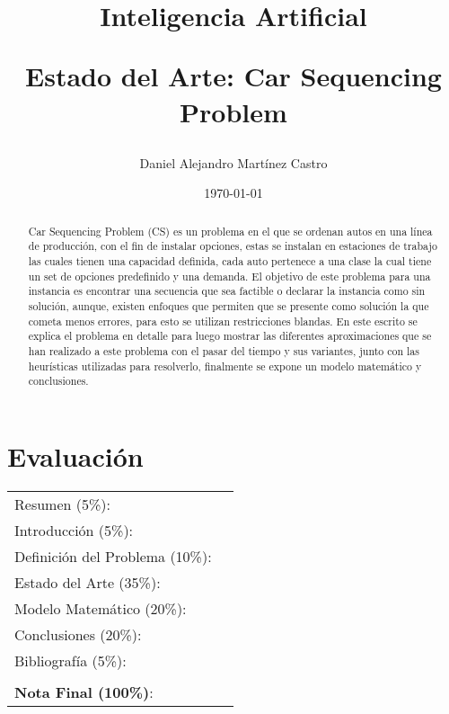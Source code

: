 \documentclass[letter, 10pt]{article}
\begin{document}
\title{Inteligencia Artificial \\ \begin{Large}Estado del Arte: Car Sequencing Problem\end{Large}}
\author{Daniel Alejandro Mart\'inez Castro}
\date{\today}
\maketitle


\section*{Evaluaci\'on}

\begin{tabular}{ll}
Resumen (5\%): & \underline{\hspace{2cm}} \\
Introducci\'on (5\%):  & \underline{\hspace{2cm}} \\
Definici\'on del Problema (10\%):  & \underline{\hspace{2cm}} \\
Estado del Arte (35\%):  & \underline{\hspace{2cm}} \\
Modelo Matem\'atico (20\%): &  \underline{\hspace{2cm}}\\
Conclusiones (20\%): &  \underline{\hspace{2cm}}\\
Bibliograf\'ia (5\%): & \underline{\hspace{2cm}}\\
 &  \\
\textbf{Nota Final (100\%)}:   & \underline{\hspace{2cm}}
\end{tabular}
\begin{abstract}
Car Sequencing Problem (CS) es un problema en el que se ordenan autos en una l\'inea de producci\'on, con el fin de instalar opciones, estas se instalan en estaciones de trabajo las cuales tienen una capacidad definida, cada auto pertenece a una clase la cual tiene un set de opciones predefinido y una demanda. El objetivo de este problema para una instancia es encontrar una secuencia que sea factible o declarar la instancia como sin soluci\'on, aunque, existen enfoques que permiten que se presente como soluci\'on la que cometa menos errores, para esto se utilizan restricciones blandas. En este escrito se explica el problema en detalle para luego mostrar las diferentes aproximaciones que se han realizado a este problema con el pasar del tiempo y sus variantes, junto con las heur\'isticas utilizadas para resolverlo, finalmente se expone un modelo matem\'atico y conclusiones. 
\end{abstract}
\end{document}
